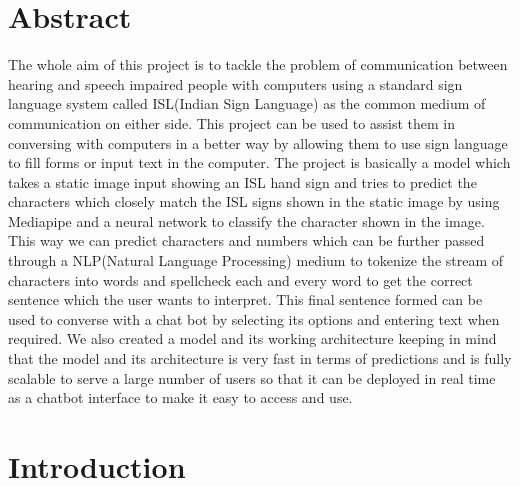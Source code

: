 \documentclass[12pt,a4paper]{report}
\begin{document}
\renewcommand\bibname{References}

\chapter*{Abstract}
The whole aim of this project is to tackle the problem of communication between hearing and speech impaired people with computers using a standard sign language system called ISL(Indian Sign Language) as the common medium of communication on either side. This project can be used to assist them in conversing with computers in a better way by allowing them to use sign language to fill forms or input text in the computer. The project is basically a model which takes a static image input showing an ISL hand sign and tries to predict the characters which closely match the ISL signs shown in the static image by using Mediapipe and a neural network to classify the character shown in the image. This way we can predict characters and numbers which can be further passed through a NLP(Natural Language Processing) medium to tokenize the stream of characters into words and spellcheck each and every word to get the correct sentence which the user wants to interpret. This final sentence formed can be used to converse with a chat bot by selecting its options and entering text when required. We also created a model and its working architecture keeping in mind that the model and its architecture is very fast in terms of predictions and is fully scalable to serve a large number of users so that it can be deployed in real time as a chatbot interface to make it easy to access and use.

\tableofcontents
\listoffigures
\listoftables

\chapter{Introduction}
\end{document}
